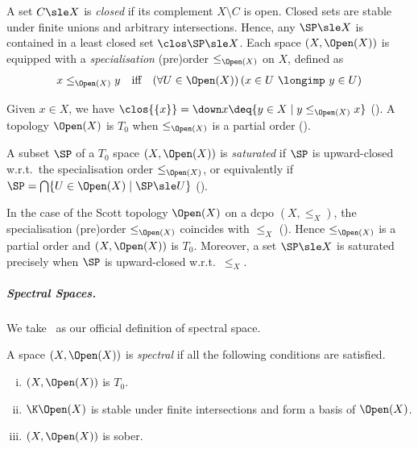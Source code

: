 A set $C \sle X$ is \emph{closed} if its complement $X \setminus C$ is open.
Closed sets are stable under finite unions and arbitrary
intersections.
Hence, any $\SP \sle X$ is contained in a least closed
set $\clos \SP  \sle X$. %
%
Each space $(X,\Open(X))$ is equipped with a \emph{specialisation} (pre)order
$\leq_{\Open(X)}$ on $X$, defined as
\[
\begin{array}{l l l}
  x \leq_{\Open(X)} y
& \text{iff}
& (\forall U \in \Open(X))
  \left(
  x \in U
  ~\longimp~
  y \in U
  \right)
\end{array}
\]

\noindent
Given $x \in X$, we have
$\clos{\{x\}} = \down x \deq \{ y \in X \mid y \leq_{\Open(X)} x\}$
(\cite[Lemma 4.2.7]{goubault13book}).
A topology $\Open(X)$ %
is \emph{$T_0$} when $\leq_{\Open(X)}$ is a partial order
(\cite[Proposition 4.2.3]{goubault13book}).


A subset $\SP$ of a $T_0$ space $(X,\Open(X))$ is \emph{saturated}
if $\SP$ is upward-closed w.r.t.\ the specialisation order $\leq_{\Open(X)}$,
or equivalently if
$\SP = \bigcap \{U \in \Open(X) \mid \SP \sle U \}$
(\cite[Proposition~4.2.9]{goubault13book}).


In the case of the Scott topology $\Open(X)$ on a dcpo $(X,\leq_X)$,
the specialisation (pre)order $\leq_{\Open(X)}$ 
coincides with $\leq_X$ (\cite[Lemma 1.2.3]{ac98book}).
Hence $\leq_{\Open(X)}$ is a partial order and $(X,\Open(X))$ is $T_0$.
Moreover, a set $\SP \sle X$ is saturated precisely when $\SP$
is upward-closed w.r.t.\ $\leq_X$.




\subparagraph*{Spectral Spaces.}

We take~\cite[Definition 1.1.5]{dst19book} as our official
definition of spectral space.

\begin{definition}
\label{def:proof:spectral}
A space $(X,\Open(X))$ is \emph{spectral} if all the following conditions
are satisfied.
\begin{enumerate}[(i)]
\item
\label{item:proof:spectral:T0}
$(X,\Open(X))$ is $T_0$.

\item
\label{item:proof:spectral:KO}
$\K\Open(X)$ is stable under finite intersections
and form a basis of $\Open(X)$.

\item
\label{item:proof:spectral:sober}
$(X,\Open(X))$ is sober.
\end{enumerate}
\end{definition}

